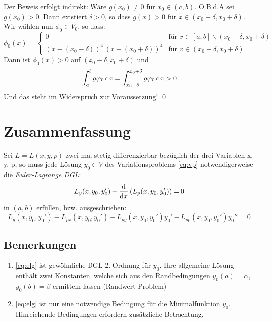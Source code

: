 \begin{beweis}
Der Beweis erfolgt indirekt: Wäre $g(x_0) \neq 0$ für $x_0 \in (a, b)$. O.B.d.A sei $g(x_0) > 0$. Dann existiert $\delta > 0$,
so dass $g(x) > 0$ für $x\in (x_0 - \delta, x_0 + \delta)$.\\
Wir wählen nun $\phi_0\in V_0$, so dass:
\begin{equation*}
    \phi_0(x) =
    \begin{cases}
        0 & \text{für $x\in [a, b]\backslash(x_0-\delta, x_0+\delta)$}
        \\
        (x-(x_0-\delta))^4\,(x-(x_0+\delta))^4 & \text{für $x\in(x_0-\delta, x_0+\delta)$}
    \end{cases}
\end{equation*}
Dann ist $\phi_0(x) > 0$ auf $(x_0 - \delta, x_0 + \delta)$ und
\[ \int_{a}^{b} g \varphi_0 \, \mathrm{d}x = \int_{x_0-\delta}^{x_0+\delta} g \varphi_0 \, \mathrm{d}x > 0 \]
Und das steht im Widerspruch zur Voraussetzung! \qed
\end{beweis}

\section{Zusammenfassung}

\begin{thm}
    Sei $L = L(x, y, p)$ zwei mal stetig differenzierbar bezüglich der drei Variablen x, y, p, so muss jede Lösung $y_0\in V$
    des Variationsproblems \eqref{eq:vp} notwendigerweise die \textit{Euler-Lagrange DGL}:
    \begin{equation}
        L_y(x, y_0, y_0') - \frac{\mathrm{d} }{\mathrm{d} x}\left(L_p(x, y_0, y_0')\right) = 0 \label{eq:elg}
    \end{equation}
    in $(a, b)$ erfüllen, bzw. ausgeschrieben:
    \begin{equation*}
        L_y(x, y_0, y_0') - L_{px}(x, y_0, y_0') - L_{py}(x, y_0, y_0')y_0' - L_{pp}(x, y_0, y_0')y_0'' = 0
    \end{equation*}
\end{thm}

\subsection*{Bemerkungen}
\begin{enumerate}
    \item \eqref{eq:elg} ist gewöhnliche DGL 2. Ordnung für $y_0$. Ihre allgemeine Lösung enthält zwei Konstanten, welche
        sich aus den Randbedingungen $y_0(a) = \alpha$, $y_0(b) = \beta$ ermitteln lassen (Randwert-Problem)
    \item \eqref{eq:elg} ist nur eine notwendige Bedingung für die Minimalfunktion $y_0$. Hinreichende Bedingungen
        erfordern zusätzliche Betrachtung.
\end{enumerate}

